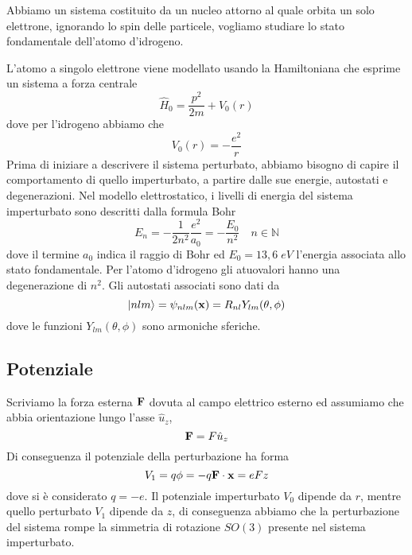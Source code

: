 Abbiamo un sistema costituito da un nucleo attorno al quale orbita un solo elettrone, ignorando lo spin delle particele, vogliamo studiare lo stato fondamentale dell'atomo d'idrogeno.

L'atomo a singolo elettrone viene modellato usando la Hamiltoniana che esprime un sistema a forza centrale 
\begin{equation}
	\hat{H}_0 = \frac{p^2}{2m} + V_0(r)
\end{equation}
dove per l'idrogeno abbiamo che
\begin{equation*}
	V_0 (r) = - \frac{e^2}{r}
\end{equation*}
Prima di iniziare a descrivere il sistema perturbato, abbiamo bisogno di capire il comportamento di quello imperturbato, a partire dalle sue energie, autostati e degenerazioni. Nel modello elettrostatico, i livelli di energia del sistema imperturbato sono descritti dalla formula Bohr
\begin{equation*}
	E_n = - \frac{1}{2n^2}\frac{e^2}{a_0} = -\frac{E_0}{n^2} \quad n \in \mathbb{N}
\end{equation*}
dove il termine $a_0$ indica il raggio di Bohr ed $E_0 = 13,6 \; eV$ l'energia associata allo stato fondamentale. Per l'atomo d'idrogeno gli atuovalori hanno una degenerazione di $n^2$. Gli autostati associati sono dati da 
\begin{equation*}
	|nlm \rangle = \psi_{nlm}(\bold{x}) = R_{nl}Y_{lm}(\theta,\phi)
\end{equation*}
dove le funzioni $Y_{lm}(\theta, \phi)$ sono armoniche sferiche.

\subsection{Potenziale}
Scriviamo la forza esterna $\bold{F}$ dovuta al campo elettrico esterno ed assumiamo che abbia orientazione lungo l'asse $\hat{u}_{z}$,
\begin{equation*}
	\bold{F} = F \hat{u}_{z}
\end{equation*}
Di conseguenza il potenziale della perturbazione ha forma
\begin{equation*}
	V_1 = q \phi = - q\bold{F} \cdot \bold{x} = eFz
\end{equation*}
dove si \`e considerato $q = -e $. Il potenziale imperturbato $V_0$ dipende da $r$, mentre quello perturbato $V_1$ dipende da $z$, di conseguenza abbiamo che la perturbazione del sistema rompe la simmetria di rotazione $SO(3)$ presente nel sistema imperturbato.

